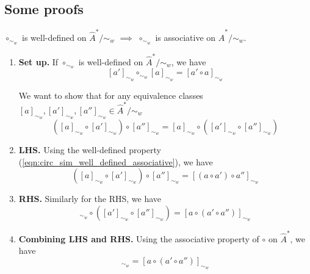 \subsection{Some proofs}

\begin{propositionE}\label{prp:circ_local_well_defined_implies_circ_local_associative}
    $\circ_{\sim_{w}}$ is well-defined on $\hat{A}^{*}/\sim_{w}$ $\implies$ $\circ_{\sim_{w}}$ is associative on $\hat{A}^{*}/\sim_{w}$.
\end{propositionE}
\begin{proofE}
\begin{enumerate}[(1)]
    \item \textbf{Set up.}
    If $\circ_{\sim_{w}}$ is well-defined on $\hat{A}^{*}/\sim_{w}$, we have
    \begin{equation}\label{eqn:circ_sim_well_defined_associative}
        [a']_{\sim_{w}} \circ_{\sim_{w}} [a]_{\sim_{w}} = [a' \circ a]_{\sim_{w}}
    \end{equation}

    We want to show that for any equivalence classes $[a]_{\sim_{w}}, [a']_{\sim_{w}}, [a'']_{\sim_{w}} \in \hat{A}^{*}/\sim_{w}$
    \begin{equation}
        ([a]_{\sim_{w}} \circ [a']_{\sim_{w}}) \circ [a'']_{\sim_{w}} = [a]_{\sim_{w}} \circ ([a']_{\sim_{w}} \circ [a'']_{\sim_{w}})
    \end{equation}

    \item \textbf{LHS.}
    Using the well-defined property (\cref{eqn:circ_sim_well_defined_associative}), we have
    \begin{equation}
        ([a]_{\sim_{w}} \circ [a']_{\sim_{w}}) \circ [a'']_{\sim_{w}} = [(a \circ a') \circ a'']_{\sim_{w}}
    \end{equation}

    \item \textbf{RHS.}
    Similarly for the RHS, we have
    \begin{equation}
        [a]_{\sim_{w}} \circ ([a']_{\sim_{w}} \circ [a'']_{\sim_{w}}) = [a \circ (a' \circ a'')]_{\sim_{w}}
    \end{equation}
    \item \textbf{Combining LHS and RHS.}
    Using the associative property of $\circ$ on $\hat{A}^{*}$, we have
    \begin{equation}
        [(a \circ a') \circ a'']_{\sim_{w}} = [a \circ (a' \circ a'')]_{\sim_{w}}
    \end{equation}
\end{enumerate}
\end{proofE}

